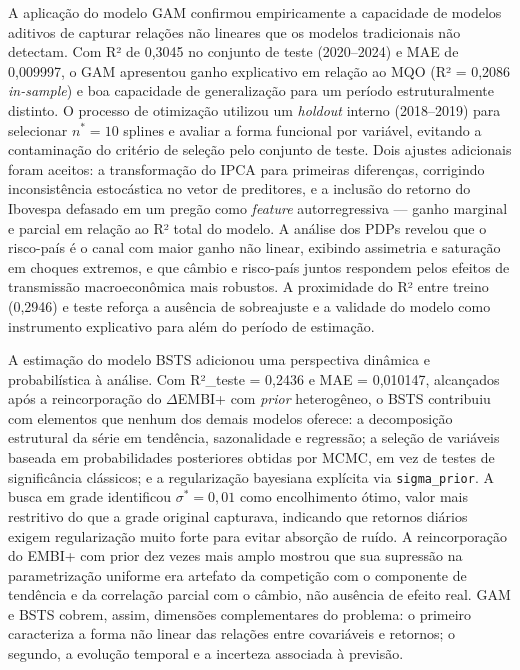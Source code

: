 \documentclass[	12pt, Times, openright, oneside, a4paper, english, brazil]{abntex2}
\begin{document}
A aplicação do modelo GAM confirmou empiricamente a capacidade de modelos aditivos de capturar relações não lineares que os modelos tradicionais não detectam. Com R² de 0{,}3045 no conjunto de teste (2020--2024) e MAE de 0{,}009997, o GAM apresentou ganho explicativo em relação ao MQO (R² = 0{,}2086 \textit{in-sample}) e boa capacidade de generalização para um período estruturalmente distinto. O processo de otimização utilizou um \textit{holdout} interno (2018--2019) para selecionar $n^* = 10$ splines e avaliar a forma funcional por variável, evitando a contaminação do critério de seleção pelo conjunto de teste. Dois ajustes adicionais foram aceitos: a transformação do IPCA para primeiras diferenças, corrigindo inconsistência estocástica no vetor de preditores, e a inclusão do retorno do Ibovespa defasado em um pregão como \textit{feature} autorregressiva — ganho marginal e parcial em relação ao R² total do modelo. A análise dos PDPs revelou que o risco-país é o canal com maior ganho não linear, exibindo assimetria e saturação em choques extremos, e que câmbio e risco-país juntos respondem pelos efeitos de transmissão macroeconômica mais robustos. A proximidade do R² entre treino (0{,}2946) e teste reforça a ausência de sobreajuste e a validade do modelo como instrumento explicativo para além do período de estimação.

A estimação do modelo BSTS adicionou uma perspectiva dinâmica e probabilística à análise. Com R²\_teste = 0{,}2436 e MAE = 0{,}010147, alcançados após a reincorporação do $\Delta$EMBI+ com \textit{prior} heterogêneo, o BSTS contribuiu com elementos que nenhum dos demais modelos oferece: a decomposição estrutural da série em tendência, sazonalidade e regressão; a seleção de variáveis baseada em probabilidades posteriores obtidas por MCMC, em vez de testes de significância clássicos; e a regularização bayesiana explícita via \texttt{sigma\_prior}. A busca em grade identificou $\sigma^* = 0{,}01$ como encolhimento ótimo, valor mais restritivo do que a grade original capturava, indicando que retornos diários exigem regularização muito forte para evitar absorção de ruído. A reincorporação do EMBI+ com prior dez vezes mais amplo mostrou que sua supressão na parametrização uniforme era artefato da competição com o componente de tendência e da correlação parcial com o câmbio, não ausência de efeito real. GAM e BSTS cobrem, assim, dimensões complementares do problema: o primeiro caracteriza a forma não linear das relações entre covariáveis e retornos; o segundo, a evolução temporal e a incerteza associada à previsão.
\end{document}
